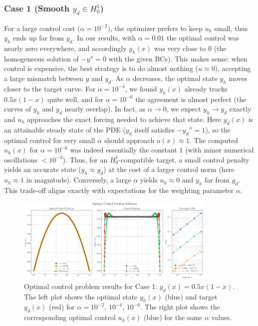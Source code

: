 \documentclass[a4paper,10pt]{article}
\begin{document}
\subsubsection*{Case 1 (Smooth $y_d \in H^1_0$)}
For a large control cost ($\alpha=10^{-2}$), the optimizer prefers to keep $u_h$ small, thus $y_h$ ends up far from $y_d$. In our results, with $\alpha=0.01$ the optimal control was nearly zero everywhere, and accordingly $y_h(x)$ was very close to 0 (the homogeneous solution of $-y''=0$ with the given BCs).
This makes sense: when control is expensive, the best strategy is to do almost nothing ($u\approx0$), accepting a large mismatch between $y$ and $y_d$.
As $\alpha$ decreases, the optimal state $y_h$ moves closer to the target curve. For $\alpha=10^{-4}$, we found $y_h(x)$ already tracks $0.5x(1-x)$ quite well, and for $\alpha=10^{-6}$ the agreement is almost perfect (the curves of $y_h$ and $y_d$ nearly overlap). In fact, as $\alpha\to 0$, we expect $y_h\to y_d$ exactly and $u_h$ approaches the exact forcing needed to achieve that state. Here $y_d(x)$ is an attainable steady state of the PDE ($y_d$ itself satisfies $-y_d'' = 1$), so the optimal control for very small $\alpha$ should approach $u(x)\approx 1$. The computed $u_h(x)$ for $\alpha=10^{-6}$ was indeed essentially the constant 1 (with minor numerical oscillations $<10^{-3}$). Thus, for an $H^1_0$-compatible target, a small control penalty yields an accurate state ($y_h \approx y_d$) at the cost of a larger control norm (here $u_h\approx 1$ in magnitude). Conversely, a large $\alpha$ yields $u_h\approx 0$ and $y_h$ far from $y_d$. This trade-off aligns exactly with expectations for the weighting parameter $\alpha$.
\begin{figure}[H]
	\centering
	\includegraphics[width=0.85\textwidth]{figures/opt_control_plot_Case 1.png}
	\caption{Optimal control problem results for Case 1: $y_d(x)=0.5x(1-x)$. The left plot shows the optimal state $y_h(x)$ (blue) and target $y_d(x)$ (red) for $\alpha=10^{-2},\,10^{-4},\,10^{-6}$. The right plot shows the corresponding optimal control $u_h(x)$ (blue) for the same $\alpha$ values.}
	\label{fig:opt_control_case1}
\end{figure}
\end{document}

